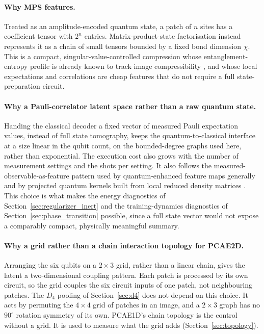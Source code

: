 \documentclass[pdflatex,sn-basic]{sn-jnl}
\begin{document}
\paragraph{Why MPS features.}
Treated as an amplitude-encoded quantum state, a patch of $n$ sites has a coefficient tensor with $2^{n}$ entries.
Matrix-product-state factorisation instead represents it as a chain of small tensors bounded by a fixed bond dimension $\chi$.
This is a compact, singular-value-controlled compression whose entanglement-entropy profile is already known to track image compressibility \citep{Latorre2005, Stoudenmire2016}, and whose local expectations and correlations are cheap features that do not require a full state-preparation circuit.


\paragraph{Why a Pauli-correlator latent space rather than a raw quantum state.}
Handing the classical decoder a fixed vector of measured Pauli expectation values, instead of full state tomography, keeps the quantum-to-classical interface at a size linear in the qubit count, on the bounded-degree graphs used here, rather than exponential.
The execution cost also grows with the number of measurement settings and the shots per setting.
It also follows the measured-observable-as-feature pattern used by quantum-enhanced feature maps generally \citep{Havlicek2019} and by projected quantum kernels built from local reduced density matrices \citep{Huang2021PowerData}.
This choice is what makes the energy diagnostics of Section~\ref{sec:regularizer_inert} and the training-dynamics diagnostics of Section~\ref{sec:phase_transition} possible, since a full state vector would not expose a comparably compact, physically meaningful summary.



\paragraph{Why a grid rather than a chain interaction topology for PCAE2D.}
Arranging the six qubits on a $2\times3$ grid, rather than a linear chain, gives the latent a two-dimensional coupling pattern.
Each patch is processed by its own circuit, so the grid couples the six circuit inputs of one patch, not neighbouring patches.
The $D_4$ pooling of Section~\ref{sec:d4} does not depend on this choice.
It acts by permuting the $4\times4$ grid of patches in an image, and a $2\times3$ graph has no $90^\circ$ rotation symmetry of its own.
PCAE1D's chain topology is the control without a grid.
It is used to measure what the grid adds (Section~\ref{sec:topology}).
\end{document}
